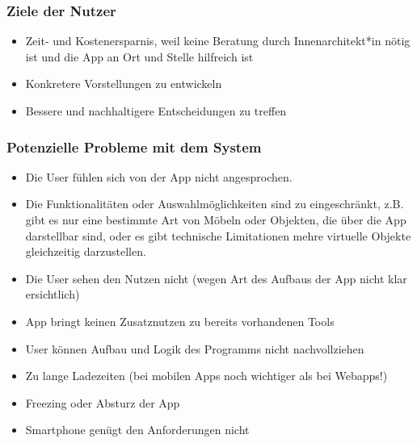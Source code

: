 \documentclass[12pt,paper=a4,oneside,hidelinks,headings=small,captions=heading,captions=nooneline]{scrartcl}
\begin{document}
\subsubsection{Ziele der Nutzer}
\label{sec:org0215048}
\begin{itemize}
\item Zeit- und Kostenersparnis, weil keine Beratung durch
Innenarchitekt*in nötig ist und die App an Ort und Stelle hilfreich
ist
\item Konkretere Vorstellungen zu entwickeln
\item Bessere und nachhaltigere Entscheidungen zu treffen
\end{itemize}

\subsubsection{Potenzielle Probleme mit dem System}
\label{sec:org84205a6}
\begin{itemize}
\item Die User fühlen sich von der App nicht angesprochen.
\item Die Funktionalitäten oder Auswahlmöglichkeiten sind zu
eingeschränkt, z.B. gibt es nur eine bestimmte Art von Möbeln oder
Objekten, die über die App darstellbar sind, oder es gibt technische
Limitationen mehre virtuelle Objekte gleichzeitig darzustellen.
\item Die User sehen den Nutzen nicht (wegen Art des Aufbaus der App nicht
klar ersichtlich)
\item App bringt keinen Zusatznutzen zu bereits vorhandenen Tools
\item User können Aufbau und Logik des Programms nicht nachvollziehen
\item Zu lange Ladezeiten (bei mobilen Apps noch wichtiger als bei Webapps!)
\item Freezing oder Absturz der App
\item Smartphone genügt den Anforderungen nicht
\end{itemize}
\end{document}
